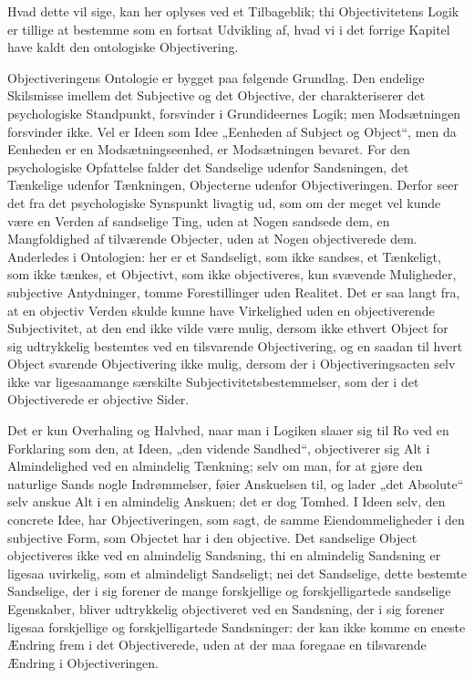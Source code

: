 \documentclass[12pt]{book}
\newcommand{\opage}[1]{\marginnote{\footnotesize\textit{[#1]}}}
\begin{document}
Hvad dette vil sige, kan her oplyses ved et Tilbageblik; thi Objectivitetens Logik er tillige at
bestemme som en fortsat Udvikling af, hvad vi i det forrige Kapitel have kaldt den ontologiske
Objectivering.

Objectiveringens Ontologie er bygget paa følgende Grundlag. Den endelige Skilsmisse imellem det
Subjective og det Objective, der charakteriserer det psychologiske Standpunkt, forsvinder i
Grundideernes Logik; men Modsætningen forsvinder ikke. Vel er Ideen som Idee „Eenheden af Subject og
Object“, men da Eenheden er en Modsætningseenhed, er Modsætningen bevaret. For den psychologiske
Opfattelse falder det Sandselige udenfor Sandsningen, det Tænkelige udenfor Tænkningen, Objecterne
udenfor Objectiveringen. Derfor seer det fra det psychologiske Synspunkt livagtig ud, som om der meget
vel kunde være en Verden af sandselige Ting, uden at Nogen sandsede dem, en Mangfoldighed af tilværende
Objecter, uden at Nogen objectiverede dem. Anderledes i Ontologien: her er et Sandseligt, som ikke
sandses, et Tænkeligt, som ikke tænkes, et Objectivt, som ikke objectiveres, kun svævende Muligheder,
subjective Antydninger, tomme Forestillinger uden Realitet. Det er saa langt fra, at en objectiv Verden
skulde
\opage{269} kunne have Virkelighed uden en objectiverende Subjectivitet, at den end ikke vilde være mulig, dersom
ikke ethvert Object for sig udtrykkelig bestemtes ved en tilsvarende Objectivering, og en saadan til
hvert Object svarende Objectivering ikke mulig, dersom der i Objectiveringsacten selv ikke var
ligesaamange særskilte Subjectivitetsbestemmelser, som der i det Objectiverede er objective Sider.

Det er kun Overhaling og Halvhed, naar man i Logiken slaaer sig til Ro ved en Forklaring som den, at
Ideen, „den vidende Sandhed“, objectiverer sig Alt i Almindelighed ved en almindelig Tænkning; selv om
man, for at gjøre den naturlige Sands nogle Indrømmelser, føier Anskuelsen til, og lader „det Absolute“
selv anskue Alt i en almindelig Anskuen; det er dog Tomhed. I Ideen selv, den concrete Idee, har
Objectiveringen, som sagt, de samme Eiendommeligheder i den subjective Form, som Objectet har i den
objective. Det sandselige Object objectiveres ikke ved en almindelig Sandsning, thi en almindelig
Sandsning er ligesaa uvirkelig, som et almindeligt Sandseligt; nei det Sandselige, dette bestemte
Sandselige, der i sig forener de mange forskjellige og forskjelligartede sandselige Egenskaber, bliver
udtrykkelig objectiveret ved en Sandsning, der i sig forener ligesaa forskjellige og forskjelligartede
Sandsninger: der kan ikke komme en eneste Ændring frem i det Objectiverede, uden at der maa foregaae en
tilsvarende Ændring i Objectiveringen.
\end{document}
